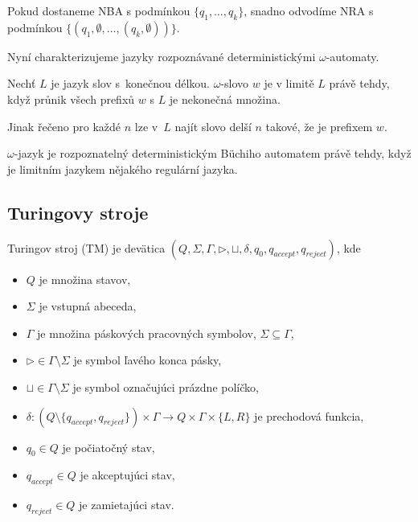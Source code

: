 Pokud dostaneme NBA s podmínkou $\{q_1, \ldots, q_k\}$,
snadno odvodíme NRA s podmínkou $\{(q_1, \emptyset, \ldots, (q_k, \emptyset))\}$.

\begin{example}
\end{example}

Nyní charakterizujeme jazyky rozpoznávané deterministickými $\omega$-automaty.

\begin{definition}
    Nechť $L$ je jazyk slov s~konečnou délkou.
    $\omega$-slovo $w$ je v limitě $L$ právě tehdy,
    když průnik všech prefixů $w$ s $L$ je nekonečná množina.
\end{definition}

Jinak řečeno pro každé $n$ lze v~$L$ najít slovo delší $n$ takové, že
je prefixem $w$.

\begin{theorem}
$\omega$-jazyk je rozpoznatelný deterministickým Büchiho automatem
právě tehdy, když je limitním jazykem nějakého regulární jazyka.
\end{theorem}


\subsection{Turingovy stroje}

\begin{definition}
    Turingov stroj (TM) je devätica $(Q, \Sigma, \Gamma, \triangleright,
	\sqcup, \delta, q_0, q_{accept}, q_{reject})$, kde
	\begin{itemize}
		\item $Q$ je množina stavov,
		\item $\Sigma$ je vstupná abeceda,
		\item $\Gamma$ je množina páskových pracovných symbolov, $\Sigma \subseteq \Gamma$,
		\item $\triangleright \in \Gamma \setminus \Sigma$ je symbol ľavého konca pásky,
		\item $\sqcup \in \Gamma \setminus \Sigma$ je symbol označujúci prázdne políčko,
		\item $\delta : (Q \setminus \{q_{accept}, q_{reject} \}) \times \Gamma \to Q \times \Gamma \times \{L,R \}$ je prechodová funkcia,
		\item $q_0 \in Q$ je počiatočný stav,
		\item $q_{accept} \in Q$ je akceptujúci stav,
		\item $q_{reject} \in Q$ je zamietajúci stav.
	\end{itemize}
\end{definition}

